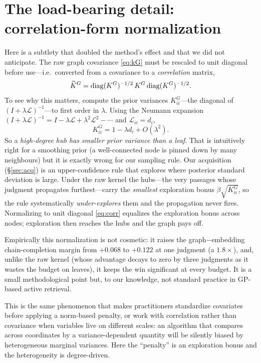 \documentclass[11pt]{article}
\theoremstyle{plain}
\theoremstyle{definition}
\theoremstyle{remark}
\begin{document}
\section{The load-bearing detail: correlation-form normalization}\label{sec:corr}
Here is a subtlety that doubled the method's effect and that we did not anticipate. The raw graph covariance
\eqref{eq:kG} must be rescaled to unit diagonal before use---i.e.\ converted from a covariance to a
\emph{correlation} matrix,
\begin{equation}
\widetilde K^{G}=\mathrm{diag}(K^{G})^{-1/2}\,K^{G}\,\mathrm{diag}(K^{G})^{-1/2}.
\label{eq:corr}
\end{equation}
To see why this matters, compute the prior variances $K^G_{ii}$---the diagonal of $(I+\lambda\mathcal L)^{-1}$---to
first order in $\lambda$. Using the Neumann expansion $(I+\lambda\mathcal L)^{-1}=I-\lambda\mathcal
L+\lambda^2\mathcal L^2-\cdots$ and $\mathcal L_{ii}=d_i$,
\begin{equation}
K^{G}_{ii}=1-\lambda d_i+O(\lambda^2).
\label{eq:hubvar}
\end{equation}
So a \emph{high-degree hub has smaller prior variance than a leaf}. That is intuitively right for a smoothing prior
(a well-connected node is pinned down by many neighbours) but it is exactly wrong for our sampling rule. Our
acquisition (\S\ref{sec:acq}) is an upper-confidence rule that explores where posterior standard deviation is
large. Under the raw kernel the hubs---the very passages whose judgment propagates furthest---carry the
\emph{smallest} exploration bonus $\beta\sqrt{K^G_{ii}}$, so the rule systematically \emph{under-explores} them and
the propagation never fires. Normalizing to unit diagonal \eqref{eq:corr} equalizes the exploration bonus across
nodes; exploration then reaches the hubs and the graph pays off.

\begin{remark}
Empirically this normalization is not cosmetic: it raises the graph$-$embedding chain-completion margin from
$+0.068$ to $+0.122$ at one judgment (a $1.8\times$), and, unlike the raw kernel (whose advantage decays to zero by
three judgments as it wastes the budget on leaves), it keeps the win significant at every budget. It is a small
methodological point but, to our knowledge, not standard practice in GP-based active retrieval.
\end{remark}

\begin{stats}
This is the same phenomenon that makes practitioners standardize covariates before applying a norm-based penalty,
or work with correlation rather than covariance when variables live on different scales: an algorithm that compares
across coordinates by a variance-dependent quantity will be silently biased by heterogeneous marginal variances.
Here the ``penalty'' is an exploration bonus and the heterogeneity is degree-driven.
\end{stats}
\end{document}
